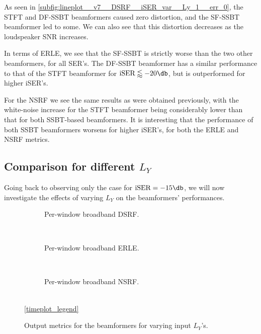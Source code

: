 As seen in \cref{subfig:lineplot__v7__DSRF__iSER_var__Ly_1__err_0}, the STFT and DF-SSBT beamformers caused zero distortion, and the SF-SSBT beamformer led to some. We can also see that this distortion decreases as the loudspeaker SNR increases.

In terms of ERLE, we see that the SF-SSBT is strictly worse than the two other beamformers, for all SER's. The DF-SSBT beamformer has a similar performance to that of the STFT beamformer for $\iser \lessapprox -20\dB$, but is outperformed for higher iSER's.

For the NSRF we see the same results as were obtained previously, with the white-noise increase for the STFT beamformer being considerably lower than that for both SSBT-based beamformers. It is interesting that the performance of both SSBT beamformers worsens for higher iSER's, for both the ERLE and NSRF metrics.

\subsection{Comparison for different $L_Y$}

Going back to observing only the case for $\iser = -15\dB$, we will now investigate the effects of varying $L_Y$ on the beamformers' performances.

\begin{figure}[!t]
	\centering
	\begin{subfigure}{\textwidth}
		\centering
		
		\caption{Per-window broadband DSRF.}
		\label{subfig:lineplot__v7__DSRF__iSER_n15__Ly_var__err_0}
	\end{subfigure}\\[1em]
	\begin{subfigure}{\textwidth}
		\centering
		
		\caption{Per-window broadband ERLE.}
		\label{subfig:lineplot__v7__ERLE__iSER_n15__Ly_var__err_0}
	\end{subfigure}\\[1em]
	\begin{subfigure}{\textwidth}
		\centering
		
		\caption{Per-window broadband NSRF.}
		\label{subfig:lineplot__v7__NSRF__iSER_n15__Ly_var__err_0}
	\end{subfigure}\\[1em]
	\ref*{timeplot_legend}
	\caption{Output metrics for the beamformers for varying input $L_Y$'s.}
	\label{fig:lineplot__v7__iSER_n15__Ly_var__err_0}
\end{figure}

